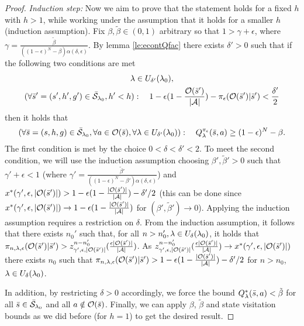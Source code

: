 \begin{proof}
\emph{Induction step:} Now we aim to prove that the statement holds for a fixed $h$ with $h>1$, while working under the assumption that it holds for a smaller $h$ (induction assumption).
Fix $\beta,\tilde{\beta} \in (0,1)$ arbitrary so that
$1 > \gamma + \epsilon$, where $\gamma = \frac{\tilde{\beta}}{((1-\epsilon)^N -\beta)\alpha(\delta,\epsilon)}$.
By lemma \ref{le:econtQfac} there exists $\delta'>0$ such that
if the following two conditions are met
$$
\begin{gathered}
\mathit{\lambda} \in U_{\delta'}(\mathit{\lambda}_0),
\\
(\forall \bar{s}' = (s',h',g') \in \bar{\mathcal{S}}_{\mathit{\lambda}_0},h' < h ):
\quad
1 - \epsilon(1 - \frac{\mathcal{O}(\bar{s}')}{|\mathcal{A}|}) - \pi_{\epsilon}(\mathcal{O}(\bar{s}')|\bar{s}')
< \frac{\delta'}{2}
\end{gathered}
$$
then it holds that
$$
(\forall \bar{s} = (s,h,g) \in \bar{\mathcal{S}}_{\mathit{\lambda}_0}, \forall a \in \mathcal{O}(\bar{s}), \forall \mathit{\lambda}\in U_{\delta'}(\mathit{\lambda}_0) ):
\quad
Q_{\mathit{\lambda}}^{\pi_{\epsilon}}(\bar{s},a) \geq
(1-\epsilon)^N - \beta.
$$
The first condition is met by the choice $0<\delta < \delta'<2$.
To meet the second condition, we will use the induction assumption
choosing $\beta',\tilde{\beta}' >0$ such that $\gamma'+\epsilon < 1$
(where $\gamma' = \frac{\tilde{\beta}'}{((1-\epsilon)^N-\beta')\alpha(\delta,\epsilon)}$) and $x^*(\gamma',\epsilon,|\mathcal{O}(\bar{s}')|) > 1-\epsilon(1-\frac{|\mathcal{O}(\bar{s}')|}{|\mathcal{A}|})-\delta'/2$
(this can be done since $x^*(\gamma',\epsilon,|\mathcal{O}(\bar{s}')|) \rightarrow 1 - \epsilon(1-\frac{|\mathcal{O}(\bar{s}')|}{|\mathcal{A}|})$ for $(\beta',\tilde{\beta}') \rightarrow 0$). 
Applying the induction assumption requires a restriction on $\delta$. From the induction assumption, it follows that there exists $n_0'$ such that,
for all $n>n_0', \mathit{\lambda} \in U_{\delta}(\mathit{\lambda}_0)$, it holds that
$\pi_{n,\mathit{\lambda},\epsilon}(\mathcal{O}(\bar{s}')| \bar{s}') > z_{\gamma',\epsilon,|\mathcal{O}(\bar{s}')|}^{n-n_0'}(\frac{\epsilon|\mathcal{O}(\bar{s}')|}{|\mathcal{A}|})$.
As $z_{\gamma',\epsilon,|\mathcal{O}(\bar{s}')|}^{n-n_0'}(\frac{\epsilon|\mathcal{O}(\bar{s}')|}{|\mathcal{A}|}) \rightarrow x^*(\gamma',\epsilon,|\mathcal{O}(\bar{s}')|)$ there exists $n_0$ such that
$\pi_{n,\mathit{\lambda},\epsilon}(\mathcal{O}(\bar{s}')|\bar{s}') > 1 -\epsilon(1-\frac{|\mathcal{O}(\bar{s}')|}{|\mathcal{A}|}) - \delta'/2$
for $n>n_0$, $\mathit{\lambda} \in U_{\delta}(\mathit{\lambda}_0)$.

In addition, by restricting $\delta > 0$ accordingly, we force the bound $Q_{\mathit{\lambda}}^*(\bar{s},a) <\tilde{\beta}$ for all $\bar{s} \in \bar{\mathcal{S}}_{\mathit{\lambda}_0}$ and all $a \notin \mathcal{O}(\bar{s})$. Finally, we can apply
$\beta$, $\tilde{\beta}$ and state visitation bounds as we
did before (for $h=1$) to get the desired result.
\end{proof}


